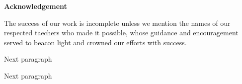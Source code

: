 \begin{center}
\begin{huge}
\bfseries{Acknowledgement}\\
\end{huge}
\end{center}
\vspace{1cm}
The success of our work is incomplete unless we mention the names of our respected taechers who made it possible, whose guidance and encouragement served to beacon light and crowned our efforts with success.



\noindent Next paragraph

\noindent Next paragraph